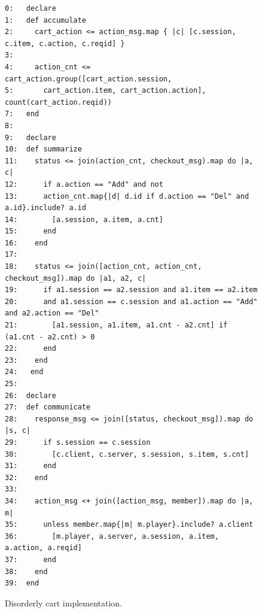 \begin{figure}[t]
\begin{scriptsize}
\begin{verbatim}
0:   declare
1:   def accumulate
2:     cart_action <= action_msg.map { |c| [c.session, c.item, c.action, c.reqid] }
3:
4:     action_cnt <= cart_action.group([cart_action.session, 
5:       cart_action.item, cart_action.action], count(cart_action.reqid))
7:   end
8:
9:   declare
10:  def summarize
11:    status <= join(action_cnt, checkout_msg).map do |a, c| 
12:      if a.action == "Add" and not 
13:      action_cnt.map{|d| d.id if d.action == "Del" and a.id}.include? a.id 
14:        [a.session, a.item, a.cnt] 
15:      end 
16:    end
17:
18:    status <= join([action_cnt, action_cnt, checkout_msg]).map do |a1, a2, c| 
19:      if a1.session == a2.session and a1.item == a2.item 
20:      and a1.session == c.session and a1.action == "Add" and a2.action == "Del"
21:        [a1.session, a1.item, a1.cnt - a2.cnt] if (a1.cnt - a2.cnt) > 0
22:      end
23:    end
24:   end
25:
26:  declare 
27:  def communicate
28:    response_msg <= join([status, checkout_msg]).map do |s, c| 
29:      if s.session == c.session
30:        [c.client, c.server, s.session, s.item, s.cnt]
31:      end
32:    end
33: 
34:    action_msg <+ join([action_msg, member]).map do |a, m|
35:      unless member.map{|m| m.player}.include? a.client
36:        [m.player, a.server, a.session, a.item, a.action, a.reqid]
37:      end 
38:    end
39:  end
\end{verbatim}
\vspace{-10pt}
\caption{Disorderly cart implementation.}
\label{fig:pdg-disorderly}
\end{scriptsize}
\vspace{-2pt}
\end{figure}

